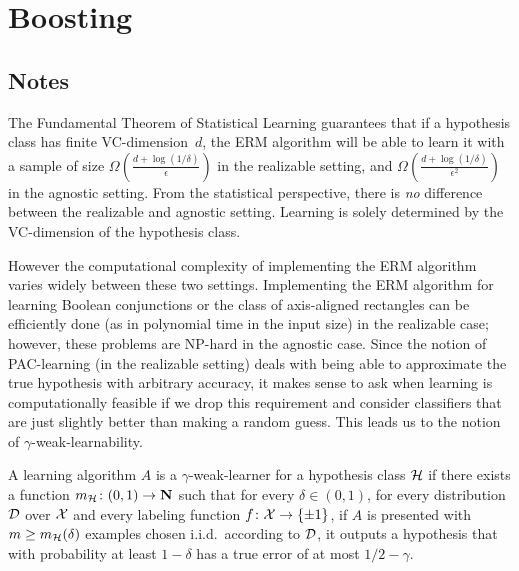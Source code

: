 \chapter{Boosting}

\section{Notes}

The Fundamental Theorem of Statistical Learning guarantees that if a hypothesis
class has finite VC-dimension~$d$, the ERM algorithm will be able to
learn it with a sample of size $\Omega(\frac{d + \log (1 / \delta)}{\epsilon})$
in the realizable setting, and $\Omega(\frac{d + \log (1 /
\delta)}{\epsilon^2})$ in the agnostic setting. From the statistical
perspective, there is \emph{no} difference between the realizable and agnostic
setting. Learning is solely determined by the VC-dimension of the hypothesis
class.

However the computational complexity of implementing the ERM algorithm varies
widely between these two settings. Implementing the ERM algorithm for learning
Boolean conjunctions or the class of axis-aligned rectangles can be efficiently
done (as in polynomial time in the input size) in the realizable case; however,
these problems are NP-hard in the agnostic case. Since the notion of
PAC-learning (in the realizable setting) deals with being able to approximate
the true hypothesis with arbitrary accuracy, it makes sense to ask when
learning is computationally feasible if we drop this requirement and consider
classifiers that are just slightly better than making a random guess.  This
leads us to the notion of $\gamma$-weak-learnability.

\begin{definition}
A learning algorithm $A$ is a $\gamma$-weak-learner for a hypothesis class 
$\mathcal{H}$ if there exists a function $m_{\mathcal{H}} \colon (0, 1) \rightarrow \mathbf{N}$
such that for every $\delta \in (0, 1)$, for every distribution $\mathcal{D}$ over $\mathcal{X}$
and every labeling function $f \colon \mathcal{X} \rightarrow \{\pm 1\}$, if $A$ 
is presented with $m \geq m_{\mathcal{H}} (\delta)$ examples chosen i.i.d.\ 
according to $\mathcal{D}$, it outputs a hypothesis that with probability at least 
$1 - \delta$ has a true error of at most $1/2 - \gamma$. 
\end{definition}
